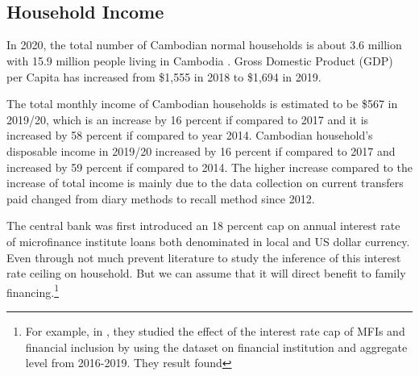 \documentclass[11pt,letterpaper]{article}
\begin{document}
\\


\\




\subsection{Household Income}
In 2020, the total number of Cambodian normal households is about 3.6 million with 15.9 million people living in Cambodia \cite{NIS2020}. Gross Domestic Product (GDP) per Capita has increased from \$1,555 in 2018 to \$1,694 in 2019. 

The total monthly income of Cambodian households is estimated to be \$567 in 2019/20, which is an increase by 16 percent if compared to 2017 and it is increased by 58 percent if compared to year 2014. Cambodian household’s disposable income in 2019/20 increased by 16 percent if compared to 2017 and increased by 59 percent if compared to 2014. The higher increase compared to the increase of total income is mainly due to the data collection on current transfers paid changed from diary methods to recall method since 2012.


The central bank was first introduced an 18 percent cap on annual interest rate of microfinance institute loans both denominated in local and US dollar currency. Even through not much prevent literature to study the inference of this interest rate ceiling on household. But we can assume that it will direct benefit to family financing.\footnote{For example, in \citet{Heng2021}, they studied the effect of the interest rate cap of MFIs and financial inclusion by using the dataset on financial institution and aggregate level from 2016-2019. They result found}  
\end{document}
